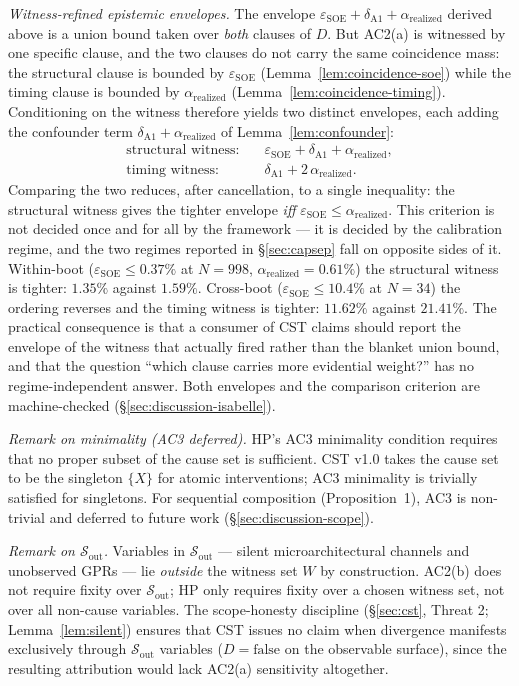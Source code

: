 \documentclass[conference]{IEEEtran}
\newcommand{\arealized}{\alpha_\text{realized}}
\newcommand{\epsSOE}{\varepsilon_\text{SOE}}
\begin{document}
\emph{Witness-refined epistemic envelopes.} The envelope
$\epsSOE + \delta_{\text{A1}} + \arealized$ derived above is a
union bound taken over \emph{both} clauses of $D$. But AC2(a) is
witnessed by one specific clause, and the two clauses do not carry
the same coincidence mass: the structural clause is bounded by
$\epsSOE$ (Lemma~\ref{lem:coincidence-soe}) while the timing clause
is bounded by $\arealized$ (Lemma~\ref{lem:coincidence-timing}).
Conditioning on the witness therefore yields two distinct
envelopes, each adding the confounder term
$\delta_{\text{A1}} + \arealized$ of Lemma~\ref{lem:confounder}:
\begin{align*}
\text{structural witness:}\quad & \epsSOE + \delta_{\text{A1}} + \arealized,\\
\text{timing witness:}\quad     & \delta_{\text{A1}} + 2\,\arealized.
\end{align*}
Comparing the two reduces, after cancellation, to a single
inequality: the structural witness gives the tighter envelope
\emph{iff} $\epsSOE \leq \arealized$. This criterion is not
decided once and for all by the framework --- it is decided by the
calibration regime, and the two regimes reported in
\S\ref{sec:capsep} fall on opposite sides of it. Within-boot
($\epsSOE \leq 0.37\%$ at $N{=}998$, $\arealized = 0.61\%$) the
structural witness is tighter: $1.35\%$ against $1.59\%$.
Cross-boot ($\epsSOE \leq 10.4\%$ at $N{=}34$) the ordering
reverses and the timing witness is tighter: $11.62\%$ against
$21.41\%$. The practical consequence is that a consumer of CST
claims should report the envelope of the witness that actually
fired rather than the blanket union bound, and that the question
``which clause carries more evidential weight?'' has no
regime-independent answer. Both envelopes and the comparison
criterion are machine-checked
(\S\ref{sec:discussion-isabelle}).

\emph{Remark on minimality (AC3 deferred).} HP's AC3 minimality
condition requires that no proper subset of the cause set is
sufficient. CST v1.0 takes the cause set to be the singleton
$\{X\}$ for atomic interventions; AC3 minimality is trivially
satisfied for singletons. For sequential composition
(Proposition~1), AC3 is non-trivial and deferred to future work
(\S\ref{sec:discussion-scope}).

\emph{Remark on $\mathcal{S}_\text{out}$.} Variables in
$\mathcal{S}_\text{out}$ --- silent microarchitectural channels
and unobserved GPRs --- lie \emph{outside} the witness set $W$
by construction. AC2(b) does not require fixity over
$\mathcal{S}_\text{out}$; HP only requires fixity over a chosen
witness set, not over all non-cause variables. The scope-honesty
discipline (\S\ref{sec:cst}, Threat 2; Lemma~\ref{lem:silent})
ensures that CST issues no claim when divergence manifests
exclusively through $\mathcal{S}_\text{out}$ variables
($D = \text{false}$ on the observable surface), since the
resulting attribution would lack AC2(a) sensitivity altogether.
\end{document}
